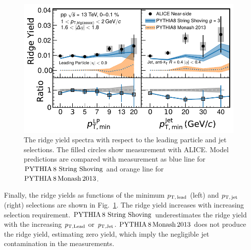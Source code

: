 \begin{figure}[h!]
	\centering
	\includegraphics[width=0.99\linewidth]{./figures/Fig6_RidgeYieldESE.pdf}
	\caption{The ridge yield spectra with respect to the leading particle and jet selections. The filled circles show measurement with ALICE. Model predictions are compared with measurement as blue line for $\mathrm{PYTHIA}\,8~\mathrm{String}~\mathrm{Shoving}$ and orange line for $\mathrm{PYTHIA}\,8\,\mathrm{Monash}\,2013$.}
	\label{fig:RidgeYield_ESE}
\end{figure}

Finally, the ridge yields as functions of the minimum $p_\mathrm{T,\,lead}$ (left) and $p_\mathrm{T,\,jet}$ (right) selections are shown in Fig.~\ref{fig:RidgeYield_ESE}. The ridge yield increases with increasing selection requirement. $\mathrm{PYTHIA}\,8~\mathrm{String}~\mathrm{Shoving}$ underestimates the ridge yield with the increasing $\it{p}_{\rm{T,Lead}}$ or $\it{p}_{\rm{T,Jet}}$. $\mathrm{PYTHIA}\,8\,\mathrm{Monash}\,2013$ does not produce the ridge yield, estimating zero yield, which imply the negligible jet contamination in the measurements.


